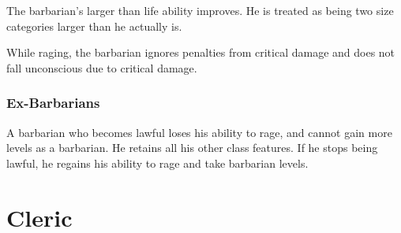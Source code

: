 The barbarian's larger than life ability improves.
He is treated as being two size categories larger than he actually is.

While raging, the barbarian ignores penalties from critical damage and does not fall unconscious due to critical damage.

\subsubsection{Ex-Barbarians}
A barbarian who becomes lawful loses his ability to rage, and cannot gain more levels as a barbarian.
He retains all his other class features.
If he stops being lawful, he regains his ability to rage and take barbarian levels.

\section{Cleric}

